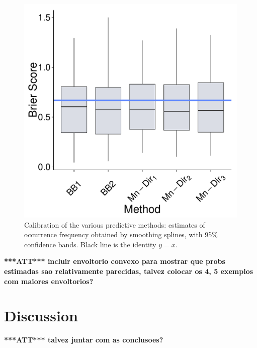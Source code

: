 \documentclass[journal,article,accept,moreauthors,pdftex,12pt,a4paper]{mdpi}
\newcommand{\red}[1]{\textbf{\color{red} ***ATT*** #1}}
\begin{document}
\begin{figure}[H]
\includegraphics[page=9,scale=0.3]{futebolComparacaoModelosForPaper.pdf}
  \caption{Calibration of the various predictive methods: estimates of occurrence frequency obtained by smoothing splines, with 95\% confidence bands. Black line is the identity $y=x$.}
  \label{fig::calibration}
\end{figure}


\red{incluir envoltorio convexo para mostrar que probs estimadas sao relativamente parecidas, talvez colocar os 4, 5 exemplos com maiores envoltorios?}


\section{Discussion}
\label{sec::discussion}

\red{talvez juntar com as conclusoes?}



\end{document}
